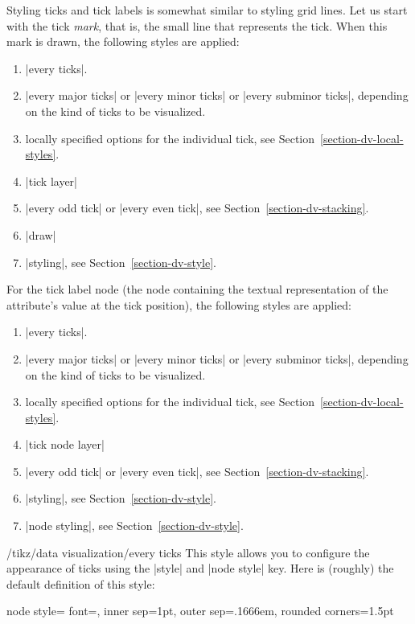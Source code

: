 Styling ticks and tick labels is somewhat similar to styling grid lines. Let us
start with the tick \emph{mark}, that is, the small line that represents the
tick. When this mark is drawn, the following styles are applied:
%
\begin{enumerate}
    \item |every ticks|.
    \item |every major ticks| or |every minor ticks| or |every subminor ticks|,
        depending on the kind of ticks to be visualized.
    \item locally specified options for the individual tick, see
        Section~\ref{section-dv-local-styles}.
    \item |tick layer|
    \item |every odd tick| or |every even tick|, see
        Section~\ref{section-dv-stacking}.
    \item |draw|
    \item |styling|, see Section~\ref{section-dv-style}.
\end{enumerate}

For the tick label node (the node containing the textual representation of the
attribute's value at the tick position), the following styles are applied:
%
\begin{enumerate}
    \item |every ticks|.
    \item |every major ticks| or |every minor ticks| or |every subminor ticks|,
        depending on the kind of ticks to be visualized.
    \item locally specified options for the individual tick, see
        Section~\ref{section-dv-local-styles}.
    \item |tick node layer|
    \item |every odd tick| or |every even tick|, see
        Section~\ref{section-dv-stacking}.
    \item |styling|, see Section~\ref{section-dv-style}.
    \item |node styling|, see Section~\ref{section-dv-style}.
\end{enumerate}

\begin{stylekey}{/tikz/data visualization/every ticks}
    This style allows you to configure the appearance of ticks using the
    |style| and |node style| key. Here is (roughly) the default definition of
    this style:
\begin{codeexample}
node style={
  font=\footnotesize,
  inner sep=1pt,
  outer sep=.1666em,
  rounded corners=1.5pt
}
\end{codeexample}
\end{stylekey}


